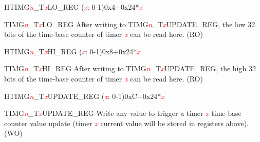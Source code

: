 \begin{register}{H}{TIMG\textcolor{red}{\it{n}}\_T\textcolor{red}{\it{x}}LO\_REG (\textcolor{red}{\it{x}}: 0-1)}{0x4+0x24*\textcolor{red}{\it{x}}}\label{regdesc:TIMERSTnLOREG}
%
\regnewline%
\begin{regdesc}\begin{reglist}
\item [TIMG\textcolor{red}{\it{n}}\_T\textcolor{red}{\it{x}}LO\_REG]After writing to TIMG\textcolor{red}{\it{n}}\_T\textcolor{red}{\it{x}}UPDATE\_REG, the low 32 bits of the time-base counter of timer \textcolor{red}{\it{x}} can be read here. (RO)
\end{reglist}\end{regdesc}
\end{register}


\begin{register}{H}{TIMG\textcolor{red}{\it{n}}\_T\textcolor{red}{\it{x}}HI\_REG (\textcolor{red}{\it{x}}: 0-1)}{0x8+0x24*\textcolor{red}{\it{x}}}\label{regdesc:TIMERSTnHIREG}
%
\regnewline%
\begin{regdesc}\begin{reglist}
\item [TIMG\textcolor{red}{\it{n}}\_T\textcolor{red}{\it{x}}HI\_REG]After writing to TIMG\textcolor{red}{\it{n}}\_T\textcolor{red}{\it{x}}UPDATE\_REG, the high 32 bits of the time-base counter of timer \textcolor{red}{\it{x}} can be read here. (RO)
\end{reglist}\end{regdesc}
\end{register}


\begin{register}{H}{TIMG\textcolor{red}{\it{n}}\_T\textcolor{red}{\it{x}}UPDATE\_REG (\textcolor{red}{\it{x}}: 0-1)}{0xC+0x24*\textcolor{red}{\it{x}}}\label{regdesc:TIMERSTnUPDATEREG}
%
\regnewline%
\begin{regdesc}\begin{reglist}
\item [TIMG\textcolor{red}{\it{n}}\_T\textcolor{red}{\it{x}}UPDATE\_REG]Write any value to trigger a timer \textcolor{red}{\it{x}} time-base counter value update (timer \textcolor{red}{\it{x}} current value will be stored in registers above). (WO)
\end{reglist}\end{regdesc}
\end{register}


